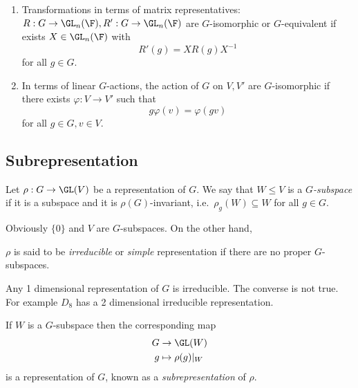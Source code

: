 \documentclass[a4paper]{article}
\theoremstyle{definition}
\begin{document}
\begin{proposition}\leavevmode
  \begin{enumerate}
  \item Transformations in terms of matrix representatives: \(R: G \to \GL_n(\F), R': G \to \GL_n(\F)\) are \(G\)-isomorphic or \(G\)-equivalent if exists \(X \in \GL_n(\F)\) with
    \[
      R'(g) = XR(g)X^{-1}
    \]
    for all \(g \in G\).
  \item In terms of linear \(G\)-actions, the action of \(G\) on \(V, V'\) are \(G\)-isomorphic if there exists \(\varphi: V \to V'\) such that
    \[
      g\varphi(v) = \varphi(gv)
    \]
    for all \(g \in G, v \in V\).
\end{enumerate}
\end{proposition}

\subsection{Subrepresentation}

\begin{definition}[\(G\)-subspace]
  Let \(\rho: G \to \GL(V)\) be a representation of \(G\). We say that \(W \leq V\) is a \emph{\(G\)-subspace} if it is a subspace and it is \(\rho(G)\)-invariant, i.e.\ \(\rho_g(W) \subseteq W\) for all \(g \in G\).
\end{definition}

Obviously \(\{0\}\) and \(V\) are \(G\)-subspaces. On the other hand,

\begin{definition}
  \(\rho\) is said to be \emph{irreducible} or \emph{simple} representation if there are no proper \(G\)-subspaces.
\end{definition}

\begin{eg}
  Any 1 dimensional representation of \(G\) is irreducible. The converse is not true. For example \(D_8\) has a 2 dimensional irreducible representation.
\end{eg}

\begin{definition}[subrepresentation]
  If \(W\) is a \(G\)-subspace then the corresponding map
  \begin{align*}
    G &\to \GL(W) \\
    g &\mapsto \rho(g)|_W
  \end{align*}
  is a representation of \(G\), known as a \emph{subrepresentation} of \(\rho\).
\end{definition}
\end{document}
